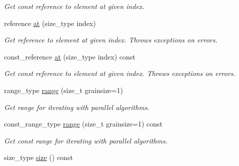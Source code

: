 \begin{DoxyCompactItemize}
\begin{DoxyCompactList}\small\item\em Get const reference to element at given index. \end{DoxyCompactList}\item 
\hypertarget{classtbb_1_1concurrent__vector_a0e47a4c0a8fe53465b7c4a744601a755}{}reference \hyperlink{classtbb_1_1concurrent__vector_a0e47a4c0a8fe53465b7c4a744601a755}{at} (size\+\_\+type index)\label{classtbb_1_1concurrent__vector_a0e47a4c0a8fe53465b7c4a744601a755}

\begin{DoxyCompactList}\small\item\em Get reference to element at given index. Throws exceptions on errors. \end{DoxyCompactList}\item 
\hypertarget{classtbb_1_1concurrent__vector_a5e155eeafe2bf2a8d7d0297024c0d161}{}const\+\_\+reference \hyperlink{classtbb_1_1concurrent__vector_a5e155eeafe2bf2a8d7d0297024c0d161}{at} (size\+\_\+type index) const \label{classtbb_1_1concurrent__vector_a5e155eeafe2bf2a8d7d0297024c0d161}

\begin{DoxyCompactList}\small\item\em Get const reference to element at given index. Throws exceptions on errors. \end{DoxyCompactList}\item 
\hypertarget{classtbb_1_1concurrent__vector_a6c6a75852f0619ae3ed382673abf4055}{}range\+\_\+type \hyperlink{classtbb_1_1concurrent__vector_a6c6a75852f0619ae3ed382673abf4055}{range} (size\+\_\+t grainsize=1)\label{classtbb_1_1concurrent__vector_a6c6a75852f0619ae3ed382673abf4055}

\begin{DoxyCompactList}\small\item\em Get range for iterating with parallel algorithms. \end{DoxyCompactList}\item 
\hypertarget{classtbb_1_1concurrent__vector_af9f4b6010310b4e6780ed77384f74e85}{}const\+\_\+range\+\_\+type \hyperlink{classtbb_1_1concurrent__vector_af9f4b6010310b4e6780ed77384f74e85}{range} (size\+\_\+t grainsize=1) const \label{classtbb_1_1concurrent__vector_af9f4b6010310b4e6780ed77384f74e85}

\begin{DoxyCompactList}\small\item\em Get const range for iterating with parallel algorithms. \end{DoxyCompactList}\item 
\hypertarget{classtbb_1_1concurrent__vector_a6cac13e24ff09a230f543ff5f523ee7c}{}size\+\_\+type \hyperlink{classtbb_1_1concurrent__vector_a6cac13e24ff09a230f543ff5f523ee7c}{size} () const \label{classtbb_1_1concurrent__vector_a6cac13e24ff09a230f543ff5f523ee7c}


\end{DoxyCompactItemize}
